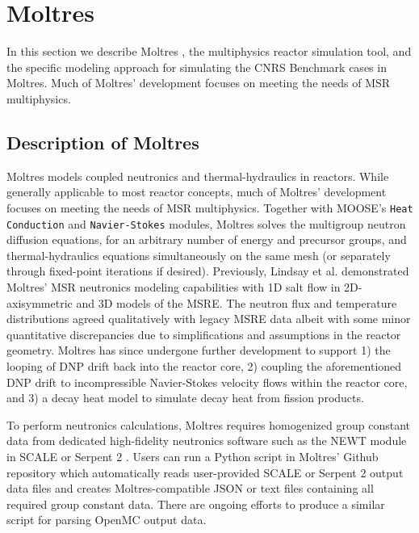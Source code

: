 \section{Moltres} \label{sec:moltres}

In this section we describe Moltres \cite{lindsay_introduction_2018}, the
multiphysics reactor simulation tool, and the specific modeling approach for
simulating the CNRS Benchmark cases in Moltres. Much of Moltres' development
focuses on meeting the needs of \gls{MSR} multiphysics.

\subsection{Description of Moltres} \label{sec:description-of-moltres}

Moltres models coupled neutronics and thermal-hydraulics in reactors. While
generally applicable to most reactor concepts, much of
Moltres' development focuses on meeting the needs of \gls{MSR} multiphysics.
Together with \gls{MOOSE}'s \cite{permann_moose_2020} \texttt{Heat}
\texttt{Conduction} and \texttt{Navier-Stokes} \cite{peterson_overview_2018}
modules, Moltres solves the multigroup neutron diffusion
equations, for an arbitrary number of energy and precursor groups, and
thermal-hydraulics equations simultaneously on the same mesh (or separately
through fixed-point iterations if desired).
Previously, Lindsay et al. \cite{lindsay_introduction_2018}
demonstrated Moltres' \gls{MSR} neutronics modeling capabilities with 1D salt
flow in 2D-axisymmetric and 3D models of the \gls{MSRE}. The neutron flux and
temperature distributions agreed qualitatively with legacy
\gls{MSRE} data albeit with some minor quantitative discrepancies due to
simplifications and assumptions in the reactor geometry. Moltres has
since undergone further development to support 1) the looping of \gls{DNP}
drift back into the reactor core, 2) coupling the aforementioned \gls{DNP}
drift to incompressible Navier-Stokes velocity flows within the reactor core,
and 3) a decay heat model to simulate decay heat from fission products.

To perform neutronics calculations, Moltres requires homogenized group constant
data from dedicated high-fidelity neutronics software such as the NEWT module
in SCALE
\cite{dehart_reactor_2011} or Serpent 2 \cite{leppanen_serpent_2014}. Users
can run a Python script in Moltres' Github repository which automatically reads
user-provided SCALE or Serpent 2 output data files and creates
Moltres-compatible JSON or text files containing all required group constant
data. There are ongoing efforts to produce a similar script for parsing OpenMC
output data.

